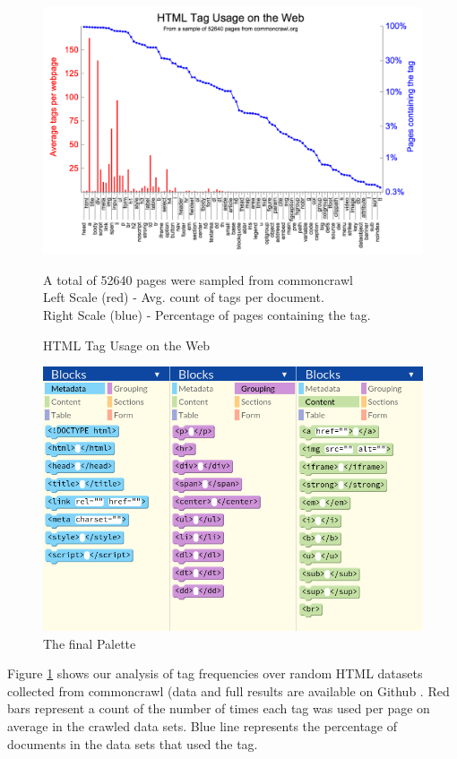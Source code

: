 \documentclass[conference]{IEEEtran}
\begin{document}
\begin{figure}
\centering
\includegraphics[width=7in]{taggraph3.png}
\caption{HTML Tag Usage on the Web}
\small
\begin{flushleft}
A total of 52640 pages were sampled from commoncrawl \cite{commoncrawl}\\
Left Scale (red) - Avg. count of tags per document.\\
Right Scale (blue) - Percentage of pages containing the tag.
\end{flushleft}
\label{Tagsgraph}
\end{figure}

\begin{figure}
\centering
\includegraphics[width=5in]{Palette.png}
\caption{The final Palette}
\label{paletteimage}
\end{figure}

Figure \ref{Tagsgraph} shows our analysis of tag frequencies over random HTML datasets collected from commoncrawl \cite{commoncrawl} (data and full results are available on Github \cite{FullResults}.  Red bars represent a count of the number of times each tag was used per page on average in the crawled data sets. Blue line represents the percentage of documents in the data sets that used the tag.
\end{document}
